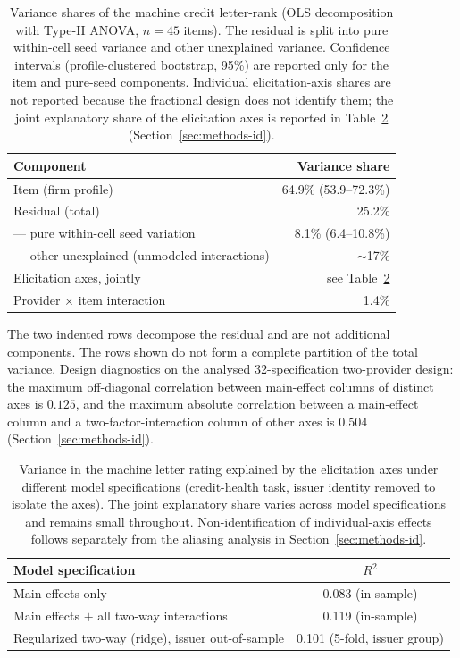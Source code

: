 \documentclass[a4paper,fleqn]{cas-sc}
\begin{document}
\begin{table}[t]\centering
\caption{Variance shares of the machine credit letter-rank (OLS decomposition with Type-II ANOVA,
$n=45$ items). The residual is split into pure within-cell seed variance and other unexplained variance.
Confidence intervals (profile-clustered bootstrap, 95\%) are reported only for the item and pure-seed components. Individual elicitation-axis shares are not reported because the fractional design does not identify them; the joint explanatory share of the elicitation axes is reported in Table~\ref{tab:varrange} (Section~\ref{sec:methods-id}).}\label{tab:var}
\begin{tabular}{lr}\toprule
Component & Variance share \\\midrule
Item (firm profile) & 64.9\% (53.9--72.3\%) \\
Residual (total) & 25.2\% \\
\quad --- pure within-cell seed variation & 8.1\% (6.4--10.8\%) \\
\quad --- other unexplained (unmodeled interactions) & $\sim$17\% \\
Elicitation axes, jointly & see Table~\ref{tab:varrange} \\
Provider $\times$ item interaction & 1.4\% \\\bottomrule
\end{tabular}

\vspace{3pt}
{\footnotesize\raggedright The two indented rows decompose the residual and are not additional
components. The rows shown do not form a complete partition of the total variance. Design diagnostics on the analysed 32-specification two-provider design: the
maximum off-diagonal correlation between main-effect columns of distinct axes is $0.125$, and the
maximum absolute correlation between a main-effect column and a two-factor-interaction column of
other axes is $0.504$ (Section~\ref{sec:methods-id}).}
\end{table}

\begin{table}[t]\centering
\caption{Variance in the machine letter rating explained by the elicitation axes under different model
specifications (credit-health task, issuer identity removed to isolate the axes). The joint explanatory share varies across model specifications and remains small throughout. Non-identification of individual-axis effects follows separately from the aliasing analysis in Section~\ref{sec:methods-id}.}
\label{tab:varrange}
\begin{tabular}{lc}\toprule
Model specification & $R^2$ \\\midrule
Main effects only & 0.083 (in-sample) \\
Main effects $+$ all two-way interactions & 0.119 (in-sample) \\
Regularized two-way (ridge), issuer out-of-sample & 0.101 (5-fold, issuer group) \\\bottomrule
\end{tabular}\end{table}
\end{document}
